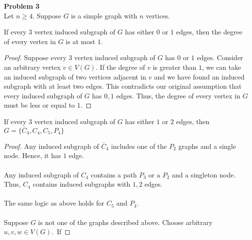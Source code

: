 \documentclass{article}
\newenvironment{claim}[2][Claim]{\begin{trivlist}
		\item[\hskip \labelsep {\bfseries #1}\hskip \labelsep {\bfseries #2}]}{\end{trivlist}}
\begin{document}
\noindent\textbf{Problem 3}\\
Let $n \geq 4$. Suppose $G$ is a simple graph with $n$ vertices.
\begin{claim}{}
If every $3$ vertex induced subgraph of $G$ has either $0$ or $1$ edges, then the degree of every vertex in $G$ is at most $1$.
\end{claim}
\begin{proof}
Suppose every $3$ vertex induced subgraph of $G$ has $0$ or $1$ edges. Consider an arbitrary vertex $v \in V(G)$. If the degree of $v$ is greater than $1$, we can take an induced subgraph of two vertices adjacent in $v$ and we have found an induced subgraph with at least two edges. This contradicts our original assumption that every induced subgraph of $G$ has $0,1$ edges. Thus, the degree of every vertex in $G$ must be less or equal to $1$. 
\end{proof}

\begin{claim}{}
If every $3$ vertex induced subgraph of $G$ has either $1$ or $2$ edges, then $G = \{ \bar C_4, C_4, C_5, P_4 \}$
\end{claim}
\begin{proof}
Any induced subgraph of $\bar C_4$ includes one of the $P_2$ graphs and a single node. Hence, it has $1$ edge.\\ \\
Any induced subgraph of $C_4$ contains a path $P_3$ or a $P_2$ and a singleton node. Thus, $C_4$ contains induced subgraphs with $1,2$ edges. \\ \\
The same logic as above holds for $C_5$ and $P_4$.\\ \\
Suppose $G$ is not one of the graphs described above. Choose arbitrary $u,v,w \in V(G)$.\
If 
\end{proof}
\end{document}
